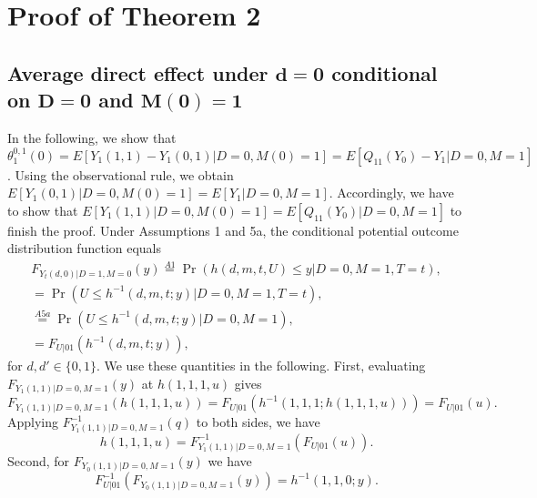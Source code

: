 \documentclass[a4paper,12pt]{article}
\begin{document}
 \doublespacing \pagestyle{plain}
\section{Proof of Theorem 2 }
\subsection{Average direct effect under $\mathbf{d=0}$ conditional on $\mathbf{D=0}$ and $\mathbf{M(0)=1}$}
In the following, we show that $\theta_1^{0,1}(0)= E[Y_1(1,1)-Y_1(0,1)|D=0,M(0)=1]=  E[Q_{11}(Y_0)-Y_1|D=0,M=1]$. Using the observational rule, we obtain $E[Y_1(0,1)|D=0,M(0)=1]=E[Y_1|D=0,M=1]$. Accordingly, we have to show that $E[Y_1(1,1)|D=0,M(0)=1]=E[Q_{11}(Y_0)|D=0,M=1]$ to finish the proof.
Under Assumptions 1 and 5a, the conditional potential outcome distribution function equals
\begin{equation} 
\begin{array}{rl}
 F_{Y_t(d,0)|D=1,M=0}(y)  \stackrel{A1}{=} \Pr(h(d,m,t,U) \leq y|D=0,M=1,T=t) ,\\
= \Pr(U \leq h^{-1}(d,m,t;y)|D=0,M=1,T=t) ,\\
\stackrel{A5a}{=} \Pr(U \leq h^{-1}(d,m,t;y)|D=0,M=1) ,\\
= F_{U|01} ( h^{-1}(d,m,t;y)),
\end{array}
\end{equation}
for $d,d' \in \{0,1\}$. We use these quantities in the following.
First, evaluating $F_{Y_1(1,1)|D=0,M=1}(y)$ at $h(1,1,1,u)$ gives
\begin{equation*}
F_{Y_1(1,1)|D=0,M=1}(h(1,1,1,u)) = F_{U|01} ( h^{-1}(1,1,1;h(1,1,1,u)))  =F_{U|01} ( u).
\end{equation*}
Applying $F_{Y_1(1,1)|D=0,M=1}^{-1}(q)$ to both sides, we have
\begin{equation} 
h(1,1,1,u)  =F_{Y_1(1,1)|D=0,M=1}^{-1}(F_{U|01} ( u)).
\end{equation}
Second, for $F_{Y_0(1,1)|D=0,M=1}(y)$ we have
\begin{equation}
F_{U|01}^{-1} ( F_{Y_0(1,1)|D=0,M=1}(y)) =   h^{-1}(1,1,0;y).
\end{equation}
\end{document}
